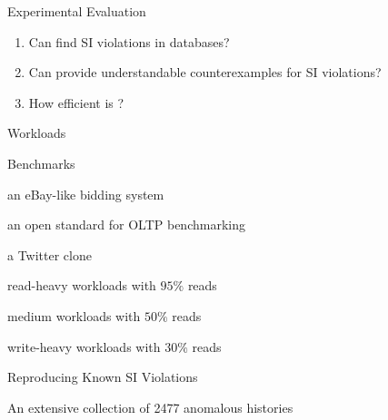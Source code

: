 
\begin{frame}{Experimental Evaluation}
	\begin{center}
		\begin{enumerate}[(1)]
			\setlength{\itemsep}{15pt}
			\item {}
			  Can \polysi{} find SI violations in databases?
			\item {}
			  Can \polysi{} provide understandable counterexamples for SI violations?
			\item {}
			  How efficient is \polysi?
		\end{enumerate}

	\end{center}
\end{frame}

\begin{frame}{Workloads}
	\begin{center}
		{}
	\end{center}
\end{frame}

\begin{frame}{Benchmarks}
	\begin{center}
		\begin{description}[GeneralRW:]
			\setlength{\itemsep}{10pt}
			\item[RuBiS:] an eBay-like bidding system
			\item[TPC-C:] an open standard for OLTP benchmarking
			\item[C-Twitter:] a Twitter clone
			\vspace{10pt}
			\item[GeneralRH:] read-heavy workloads with $95\%$ reads
			\item[GeneralRW:] medium workloads with $50\%$ reads
			\item[GeneralWH:] write-heavy workloads with $30\%$ reads
		\end{description}
	\end{center}
\end{frame}

\begin{frame}{Reproducing Known SI Violations}
	\begin{center}
		{}
		\vspace{0.80cm}

		An extensive collection of 2477 anomalous histories \\[2pt]
	\end{center}
\end{frame}

